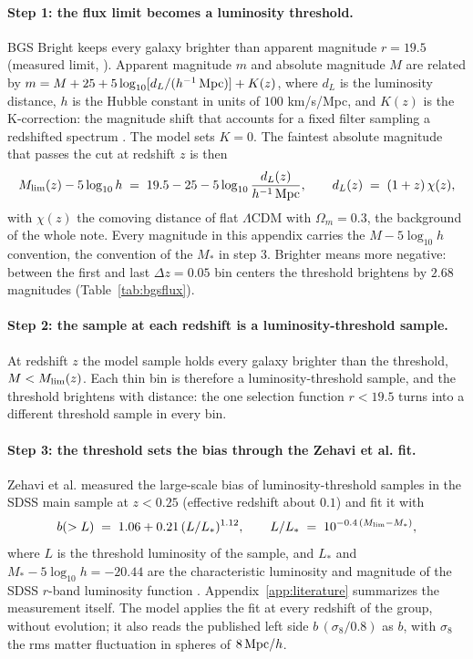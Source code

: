 \documentclass[11pt]{article}
\begin{document}
\paragraph{Step 1: the flux limit becomes a luminosity threshold.}
BGS Bright keeps every galaxy brighter than apparent magnitude
$r = 19.5$ (measured limit, \cite{Hahn2023}).  Apparent magnitude
$m$ and absolute magnitude $M$ are related by
$m = M + 25 + 5\log_{10}[d_L/(h^{-1}\,{\rm Mpc})] + K(z)$, where
$d_L$ is the luminosity distance, $h$ is the Hubble constant in
units of $100$ km/s/Mpc, and $K(z)$ is the K-correction: the
magnitude shift that accounts for a fixed filter sampling a
redshifted spectrum \cite{BlantonRoweis2007}.  The model sets
$K = 0$.  The faintest absolute magnitude that passes the cut at
redshift $z$ is then
\begin{equation}
  M_{\rm lim}(z) - 5\log_{10} h
  \;=\;
  19.5 - 25 - 5\log_{10} \frac{d_L(z)}{h^{-1}\,{\rm Mpc}},
  \qquad
  d_L(z) \;=\; (1+z)\,\chi(z),
  \label{eq:bgsmlim}
\end{equation}
with $\chi(z)$ the comoving distance of flat $\Lambda$CDM with
$\Omega_m = 0.3$, the background of the whole note.  Every magnitude
in this appendix carries the $M - 5\log_{10} h$ convention, the
convention of the $M_*$ in step 3.  Brighter means more negative:
between the first and last $\Delta z = 0.05$ bin centers the
threshold brightens by $2.68$ magnitudes
(Table~\ref{tab:bgsflux}).

\paragraph{Step 2: the sample at each redshift is a
luminosity-threshold sample.}
At redshift $z$ the model sample holds every galaxy brighter than
the threshold, $M < M_{\rm lim}(z)$.  Each thin bin is therefore a
luminosity-threshold sample, and the threshold brightens with
distance: the one selection function $r < 19.5$ turns into a
different threshold sample in every bin.

\paragraph{Step 3: the threshold sets the bias through the Zehavi
et al. fit.}
Zehavi et al. \cite{Zehavi2011} measured the large-scale bias of
luminosity-threshold samples in the SDSS main sample at $z < 0.25$
(effective redshift about $0.1$) and fit it with
\begin{equation}
  b(>L)
  \;=\;
  1.06 + 0.21\,(L/L_*)^{1.12},
  \qquad
  L/L_* \;=\; 10^{-0.4\,(M_{\rm lim} - M_*)},
  \label{eq:bgszehavi}
\end{equation}
where $L$ is the threshold luminosity of the sample, and $L_*$ and
$M_* - 5\log_{10} h = -20.44$ are the characteristic luminosity and
magnitude of the SDSS $r$-band luminosity function
\cite{Blanton2003}.  Appendix~\ref{app:literature} summarizes the
measurement itself.  The model applies the fit at every redshift of
the group, without evolution; it also reads the published left side
$b\,(\sigma_8/0.8)$ as $b$, with $\sigma_8$ the rms matter
fluctuation in spheres of $8\,{\rm Mpc}/h$.
\end{document}
